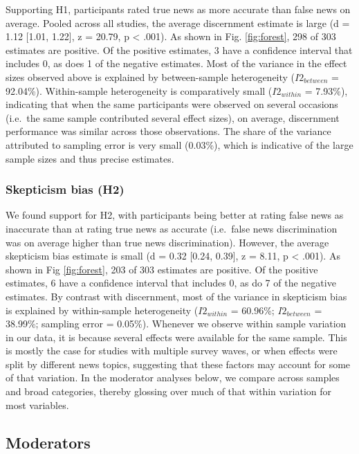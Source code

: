 \documentclass[
  man]{apa6}
\begin{document}
Supporting H1, participants rated true news as more accurate than false news on average. Pooled across all studies, the average discernment estimate is large (d = 1.12 {[}1.01, 1.22{]}, z = 20.79, p \textless{} .001). As shown in Fig. \ref{fig:forest}, 298 of 303 estimates are positive. Of the positive estimates, 3 have a confidence interval that includes 0, as does 1 of the negative estimates. Most of the variance in the effect sizes observed above is explained by between-sample heterogeneity (\(I2_{between}\) = 92.04\%). Within-sample heterogeneity is comparatively small (\(I2_{within}\) = 7.93\%), indicating that when the same participants were observed on several occasions (i.e.~the same sample contributed several effect sizes), on average, discernment performance was similar across those observations. The share of the variance attributed to sampling error is very small (0.03\%), which is indicative of the large sample sizes and thus precise estimates.

\subsubsection{Skepticism bias (H2)}\label{skepticism-bias-h2}

We found support for H2, with participants being better at rating false news as inaccurate than at rating true news as accurate (i.e.~false news discrimination was on average higher than true news discrimination). However, the average skepticism bias estimate is small (d = 0.32 {[}0.24, 0.39{]}, z = 8.11, p \textless{} .001). As shown in Fig \ref{fig:forest}, 203 of 303 estimates are positive. Of the positive estimates, 6 have a confidence interval that includes 0, as do 7 of the negative estimates. By contrast with discernment, most of the variance in skepticism bias is explained by within-sample heterogeneity (\(I2_{within}\) = 60.96\%; \(I2_{between}\) = 38.99\%; sampling error = 0.05\%). Whenever we observe within sample variation in our data, it is because several effects were available for the same sample. This is mostly the case for studies with multiple survey waves, or when effects were split by different news topics, suggesting that these factors may account for some of that variation. In the moderator analyses below, we compare across samples and broad categories, thereby glossing over much of that within variation for most variables.

\subsection{Moderators}\label{moderators}
\end{document}
